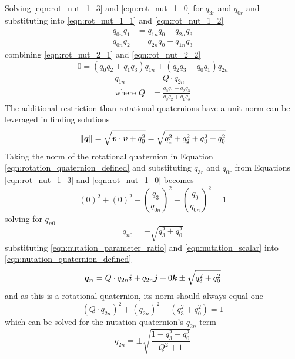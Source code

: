 Solving \ref{eqn:rot_nut_1_3} and \ref{eqn:rot_nut_1_0} for $q_{3r}$ and $q_{0r}$ and substituting into \ref{eqn:rot_nut_1_1} and \ref{eqn:rot_nut_1_2}
\begin{subequations}
  \begin{align}
    q_{0n} q_{1} &= q_{1n} q_{0} + q_{2n} q_{3} \label{eqn:rot_nut_2_1} \\
    q_{0n} q_{2} &= q_{2n} q_{0} - q_{1n} q_{3} \label{eqn:rot_nut_2_2}
  \end{align}
\end{subequations}
combining \ref{eqn:rot_nut_2_1} and \ref{eqn:rot_nut_2_2}
\begin{equation}
  0 = (q_{0}q_{2} + q_{1}q_{3}) q_{1n} + (q_{2}q_{3} - q_{0}q_{1}) q_{2n}
\end{equation}
\begin{subequations}
  \begin{align}
    q_{1n} &= Q \cdot q_{2n} \\
    \text{where } Q &= \frac{q_{0}q_{1} - q_{2}q_{3}}{q_{0}q_{2} + q_{1}q_{3}}
  \end{align}
  \label{eqn:nutation_parameter_ratio}
\end{subequations}
The additional restriction than rotational quaternions have a unit norm can be leveraged in finding solutions
\begin{equation}
  \left\| \boldsymbol{q} \right\| = \sqrt{\boldsymbol{v} \cdot \boldsymbol{v} + q_0^2} = \sqrt{q_1^2+q_2^2+q_3^2+q_0^2}
  \label{eqn:quaternion_norm}
\end{equation}
Taking the norm of the rotational quaternion in Equation \ref{eqn:rotation_quaternion_defined} and substituting $q_{3r}$ and $q_{0r}$ from Equations \ref{eqn:rot_nut_1_3} and \ref{eqn:rot_nut_1_0} becomes
\begin{equation}
  (0)^2 + (0)^2 + \left( \frac{q_3}{q_{0n}} \right)^2 + \left( \frac{q_0}{q_{0n}} \right)^2 = 1
\end{equation}
solving for $q_{n0}$
\begin{equation}
  q_{n0} = \pm \sqrt{q_3^2 + q_0^2}
  \label{eqn:nutation_scalar}
\end{equation}
substituting \ref{eqn:nutation_parameter_ratio} and \ref{eqn:nutation_scalar} into \ref{eqn:nutation_quaternion_defined}
\begin{equation}
  \boldsymbol{q_{n}}
  = Q \cdot q_{2n} \boldsymbol{i} + q_{2n} \boldsymbol{j} + 0 \boldsymbol{k} \pm \sqrt{q_3^2 + q_0^2}
\end{equation}
and as this is a rotational quaternion, its norm should always equal one
\begin{equation}
  (Q \cdot q_{2n})^2 + (q_{2n})^2 + (q_3^2 + q_0^2) = 1
\end{equation}
which can be solved for the nutation quaternion's $q_{2n}$ term
\begin{equation}
  q_{2n} = \pm \sqrt{ \frac{1  - q_3^2 - q_0^2}{Q^2 + 1} }
  \label{eqn:qn2_solution}
\end{equation}

